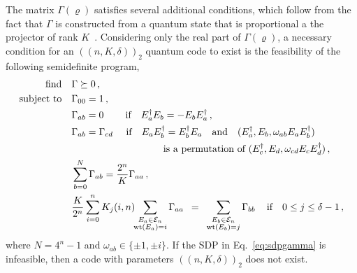 \documentclass[12pt,a4paper]{amsart}
\DeclareMathOperator{\wt}{wt}
\newcommand{\E}{\mathcal{E}}
\newcommand{\nn}{\nonumber}
\begin{document}
The matrix $\Gamma(\varrho)$ satisfies several additional conditions,
which follow from the fact that $\Gamma$ 
is constructed from a quantum state that is proportional a the projector of rank $K$~\cite[Section 5]{munne2025sdpboundsquantumcodes}. 
% 
Considering only the real part of $\Gamma(\varrho)$, 
a necessary condition for an
$(\!(n,K,\delta)\!)_2$ quantum code to exist
is the feasibility of the following semidefinite program,
% 
\begin{align}\label{eq:sdpgamma}
	\text{find} 		\quad & \Gamma \succeq 0\,, \nn \\
	\text{subject to} 	\quad
	& \Gamma_{00}=1 \,, \nn\\
        &\Gamma_{ab}=0 \hspace{-0.04cm}\quad\quad\,\,\text{if} \quad  E^\dagger_a E_b = - E_b E^\dagger_a \,, \nn \\
	&	\Gamma_{ab}=\Gamma_{cd} \,\,\quad \text{if} \quad  E_a E^\dagger_b  = E^\dagger_b E_a
	\quad \text{and}
	\quad (E^\dagger_a,E_b,\omega_{ab}E_a E^\dagger_b)\quad\, \nn\\ 
    \quad & \hspace{3.3cm} \text{is a permutation of} \,\,(E^\dagger_{c},E_{d},\omega_{cd}E_{c}E^\dagger_{d})\,, \nn\\
	& \sum^N_{b=0}\Gamma_{ab}=\frac{2^{n}}{K} \Gamma_{aa}\,, \nn \\
	& \frac{K}{2^n}\sum^n_{i=0} K_j(i,n) \!\!\sum_{\substack{E_{a} \in \E_n \\ \wt(E_a)=i}} \Gamma_{aa}
	\,\,\, = \,\,\,
	\sum_{\substack{E_b \in \E_n \\ \wt(E_b)=j}} \Gamma_{bb}  \quad \,\text{if} \quad 0\leq j \leq \delta-1 \,,
\end{align} 
where $N=4^n-1$ and $\omega_{ab} \in \{\pm 1,\pm i\}$.
% 
If the SDP in Eq.~\eqref{eq:sdpgamma} is infeasible, 
then a code with parameters $(\!(n,K,\delta)\!)_2$ does not exist. 
% 
\end{document}
